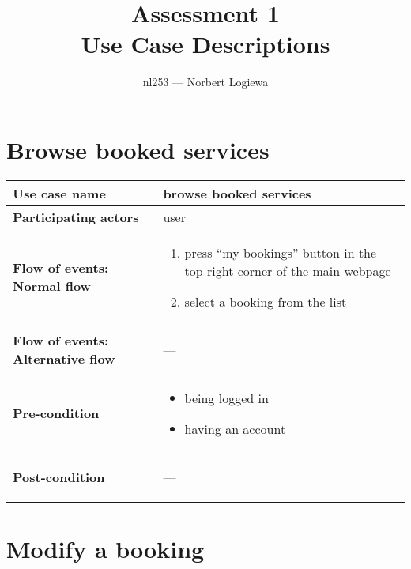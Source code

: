 \documentclass[a4paper, 13pt, draft]{report}
\author{nl253 --- Norbert Logiewa}
\title{%
    \huge{\bf{Assessment 1}} \\ 
    Use Case Descriptions \\ 
}
\begin{document}
\maketitle

\newcommand{\notapplicable}{%
\begin{center} --- \end{center}
}

\section*{Browse booked services}

\begin{center}
    \begin{tabular}{| >{\bf}l | p{5.55cm} |} 
	\hline
	Use case name & browse booked services \\ 
	\hline
	Participating actors & user \\
	\hline
	Flow of events: Normal flow & 
	\begin{enumerate}		
	    \item press ``my bookings'' button in the top right corner of the main webpage
	    \item select a booking from the list
	\end{enumerate}	\\
	\hline
	Flow of events: Alternative flow & \notapplicable \\
	\hline
	Pre-condition & 
	\begin{itemize} 
	    \item being logged in
	    \item having an account
	\end{itemize} \\
	\hline
	Post-condition & \notapplicable \\
	\hline
    \end{tabular}
\end{center}

\section*{Modify a booking}
\end{document}
